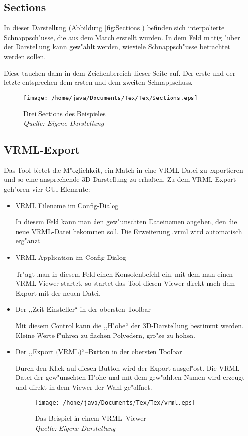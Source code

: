 \subsection{Sections}
In dieser Darstellung (Abbildung \vref{fig:Sections}) befinden  sich interpolierte Schnappsch"usse, die aus dem Match erstellt wurden. In dem Feld mittig "uber der Darstellung kann gew"ahlt werden, wieviele Schnappsch"usse betrachtet werden sollen.

Diese tauchen dann in dem Zeichenbereich dieser Seite auf. Der erste und der letzte entsprechen dem ersten und dem zweiten Schnappschuss.
\begin{figure}
   \centering
   \texttt{[image: /home/java/Documents/Tex/Tex/Sections.eps]}
   \caption[Sections]{Drei Sections des Beispieles\\\textit{Quelle: Eigene Darstellung}}
   \label{fig:Sections}
\end{figure}
\subsection{VRML-Export}
Das Tool bietet die M"oglichkeit, ein Match in eine VRML-Datei zu exportieren und so eine ansprechende 3D-Darstellung zu erhalten. Zu dem VRML-Export geh"oren vier GUI-Elemente:
\begin{itemize}
\item VRML Filename im Config-Dialog

 In diesem Feld kann man den gew"unschten Dateinamen angeben, den die neue VRML-Datei bekommen soll. Die Erweiterung .vrml wird automatisch erg"anzt
\item VRML Application im Config-Dialog

Tr"agt man in diesem Feld einen Konsolenbefehl ein, mit dem man einen VRML-Viewer startet, so startet das Tool diesen Viewer direkt nach dem Export mit der neuen Datei.

\item Der ,,Zeit-Einsteller`` in der obersten Toolbar

Mit diesem Control kann die ,,H"ohe`` der 3D-Darstellung bestimmt werden. Kleine Werte f"uhren zu flachen Polyedern, gro"se zu hohen.
\item Der ,,Export (VRML)``--Button in der obersten Toolbar

Durch den Klick auf diesen Button wird der Export ausgel"ost. Die VRML--Datei der gew"unschten H"ohe und mit dem gew"ahlten Namen wird erzeugt und direkt in dem Viewer der Wahl ge"offnet.
\begin{figure}
   \centering
   \texttt{[image: /home/java/Documents/Tex/Tex/vrml.eps]}
   \caption[VRML--Viewer]{Das Beispiel in einem VRML--Viewer\\\textit{Quelle: Eigene Darstellung}}
   \label{fig:vrml}
\end{figure}
\end{itemize}
